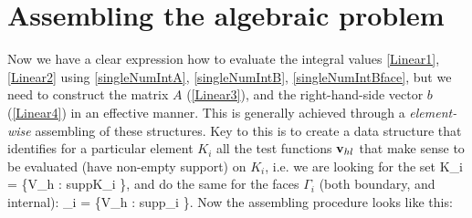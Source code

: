 \section{Assembling the algebraic problem}
Now we have a clear expression how to evaluate the integral values \ref{Linear1}, \ref{Linear2} using \ref{singleNumIntA}, \ref{singleNumIntB}, \ref{singleNumIntBface}, but we need to construct the matrix $A$ (\ref{Linear3}), and the right-hand-side vector $b$ (\ref{Linear4}) in an effective manner.
This is generally achieved through a \textit{element-wise} assembling of these structures. Key to this is to create a data structure that identifies for a particular element $K_i$ all the test functions $\mathrm{\mathbf{v}}_{hl}$ that make sense to be evaluated (have non-empty support) on $K_i$, i.e. we are looking for the set
\be
\mrvh \lo K_i \ro = \left\{\mrvh \in V_h : supp\lo\mrvh\ro \cap K_i \neq \emptyset \right\},
\ee
and do the same for the faces $\Gamma_i$ (both boundary, and internal):
\be
\mrvh \lo \Gamma_i \ro = \left\{\mrvh \in V_h : supp\lo\mrvh\ro \cap \Gamma_i \neq \emptyset \right\}.
\ee
Now the assembling procedure looks like this:\\
